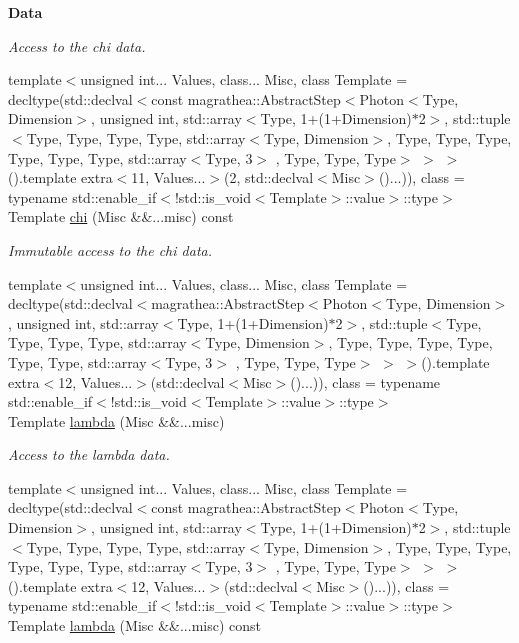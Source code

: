 \begin{Indent}{\bf Data}
\begin{DoxyCompactItemize}
\begin{DoxyCompactList}\small\item\em Access to the chi data. \end{DoxyCompactList}\item 
{\footnotesize template$<$unsigned int... Values, class... Misc, class Template  = decltype(std\-::declval$<$const magrathea\-::\-Abstract\-Step$<$\-Photon$<$\-Type, Dimension$>$, unsigned int, std\-::array$<$\-Type, 1+(1+\-Dimension)$\ast$2$>$, std\-::tuple$<$\-Type, Type, Type, Type, std\-::array$<$\-Type, Dimension$>$, Type, Type, Type, Type, Type, Type, std\-::array$<$\-Type, 3$>$ , Type, Type, Type$>$ $>$ $>$().\-template extra$<$11, Values...$>$(2, std\-::declval$<$\-Misc$>$()...)), class  = typename std\-::enable\-\_\-if$<$!std\-::is\-\_\-void$<$\-Template$>$\-::value$>$\-::type$>$ }\\Template \hyperlink{exceptionPhoton_a44975b15bd2684b360774678a92c3440}{chi} (Misc \&\&...misc) const 
\begin{DoxyCompactList}\small\item\em Immutable access to the chi data. \end{DoxyCompactList}\item 
{\footnotesize template$<$unsigned int... Values, class... Misc, class Template  = decltype(std\-::declval$<$magrathea\-::\-Abstract\-Step$<$\-Photon$<$\-Type, Dimension$>$, unsigned int, std\-::array$<$\-Type, 1+(1+\-Dimension)$\ast$2$>$, std\-::tuple$<$\-Type, Type, Type, Type, std\-::array$<$\-Type, Dimension$>$, Type, Type, Type, Type, Type, Type, std\-::array$<$\-Type, 3$>$ , Type, Type, Type$>$ $>$ $>$().\-template extra$<$12, Values...$>$(std\-::declval$<$\-Misc$>$()...)), class  = typename std\-::enable\-\_\-if$<$!std\-::is\-\_\-void$<$\-Template$>$\-::value$>$\-::type$>$ }\\Template \hyperlink{exceptionPhoton_ad664b0c1b19df5edb2e1d1a0bdee1a29}{lambda} (Misc \&\&...misc)
\begin{DoxyCompactList}\small\item\em Access to the lambda data. \end{DoxyCompactList}\item 
{\footnotesize template$<$unsigned int... Values, class... Misc, class Template  = decltype(std\-::declval$<$const magrathea\-::\-Abstract\-Step$<$\-Photon$<$\-Type, Dimension$>$, unsigned int, std\-::array$<$\-Type, 1+(1+\-Dimension)$\ast$2$>$, std\-::tuple$<$\-Type, Type, Type, Type, std\-::array$<$\-Type, Dimension$>$, Type, Type, Type, Type, Type, Type, std\-::array$<$\-Type, 3$>$ , Type, Type, Type$>$ $>$ $>$().\-template extra$<$12, Values...$>$(std\-::declval$<$\-Misc$>$()...)), class  = typename std\-::enable\-\_\-if$<$!std\-::is\-\_\-void$<$\-Template$>$\-::value$>$\-::type$>$ }\\Template \hyperlink{exceptionPhoton_a8fedce60be79a8cdb7bef7a987a2c489}{lambda} (Misc \&\&...misc) const 

\end{DoxyCompactItemize}
\end{Indent}
